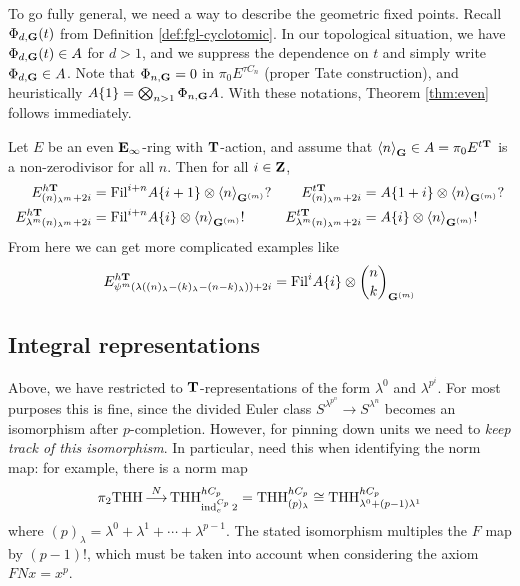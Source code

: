\begin{remark}
  To go fully general, we need a way to describe the geometric fixed points. Recall $\Phi_{d,\mathbf G}(t)$ from Definition \ref{def:fgl-cyclotomic}. In our topological situation, we have $\Phi_{d,\mathbf G}(t) \in A$ for $d>1$, and we suppress the dependence on $t$ and simply write $\Phi_{d,\mathbf G}\in A$. Note that $\Phi_{n,\mathbf G}=0$ in $\pi_0 E^{\tau C_n}$ (proper Tate construction), and heuristically $A\{1\} = \bigotimes_{n>1} \Phi_{n,\mathbf G}A$. With these notations, Theorem \ref{thm:even} follows immediately.
\end{remark}

\begin{example}
  Let $E$ be an even $\mathbf E_\infty$-ring with $\mathbf T$-action, and assume that $\left\langle n\right\rangle_\mathbf G \in A=\pi_0 E^{t\mathbf T}$ is a non-zerodivisor for all $n$. Then for all $i\in\mathbf Z$,
  \begin{align*}
    E^{h\mathbf T}_{(n)_{\lambda^m} + 2i}
      &= \mathrm{Fil}^{i+n} A\{i+1\} \otimes \left\langle n\right\rangle_{\mathbf G^{(m)}}? &
    E^{t\mathbf T}_{(n)_{\lambda^m} + 2i}
      &= A\{1+i\} \otimes \left\langle n\right\rangle_{\mathbf G^{(m)}}?\\
    E^{h\mathbf T}_{\lambda^m(n)_{\lambda^m} + 2i}
      &= \mathrm{Fil}^{i+n} A\{i\} \otimes \left\langle n\right\rangle_{\mathbf G^{(m)}}! &
    E^{t\mathbf T}_{\lambda^m(n)_{\lambda^m} + 2i}
      &= A\{i\} \otimes \left\langle n\right\rangle_{\mathbf G^{(m)}}!
  \end{align*}
  From here we can get more complicated examples like
  \[
    E^{h\mathbf T}_{\psi^m(\lambda((n)_\lambda - (k)_\lambda - (n-k)_\lambda)) + 2i}
      = \mathrm{Fil}^i A\{i\} \otimes {\binom nk}_{\mathbf G^{(m)}}
  \]
\end{example}

\subsection{Integral representations}
\label{sub:integral}

Above, we have restricted to $\mathbf T$-representations of the form $\lambda^0$ and $\lambda^{p^i}$. For most purposes this is fine, since the divided Euler class $S^{\lambda^{p^n}} \to S^{\lambda^n}$ becomes an isomorphism after $p$-completion. However, for pinning down units we need to \emph{keep track of this isomorphism}. In particular, need this when identifying the norm map: for example, there is a norm map
\[ \pi_2 \mathrm{THH} \mathop{\longrightarrow}\limits^N \mathrm{THH}^{hC_p}_{\operatorname{ind}^{C_p}_e 2} = \mathrm{THH}^{hC_p}_{(p)_\lambda} \cong \mathrm{THH}^{hC_p}_{\lambda^0 + (p-1)\lambda^1} \]
where $(p)_\lambda = \lambda^0 + \lambda^1 + \dotsb + \lambda^{p-1}$. The stated isomorphism multiples the $F$ map by $(p-1)!$, which must be taken into account when considering the axiom $FNx=x^p$.


